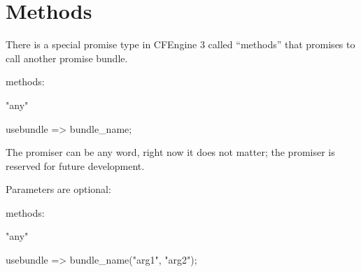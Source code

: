 \section{Methods}





There is a special promise type in CFEngine 3 called ``methods'' that promises to call another promise bundle.

\begin{code}
 methods:

        "any"

           usebundle => bundle_name;
\end{code}

The promiser can be any word, right now it does not matter; the promiser is reserved for future development.

Parameters are optional:

\begin{code}
 methods:

        "any"

           usebundle => bundle_name("arg1", "arg2");
\end{code}

